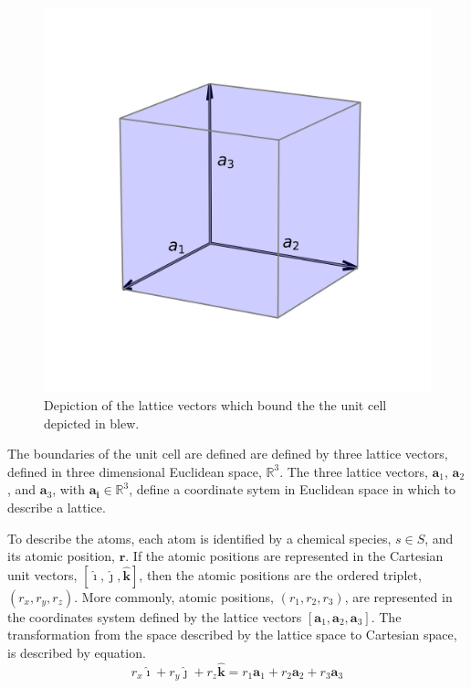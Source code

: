 \begin{figure}[ht]
	\centering
  \includegraphics{chapter3/unit_cell}
  \caption{Depiction of the lattice vectors which bound the the unit cell depicted in blew.}
  \label{fig:unit_cell}
\end{figure}

The boundaries of the unit cell are defined are defined by three lattice vectors, defined in three dimensional Euclidean space, $\mathbb{R}^3$.
The three lattice vectors, $\bm{a}_1$, $\bm{a}_2$, and $\bm{a}_3$, with $\bm{a_i}\in\mathbb{R}^3$, define a coordinate sytem in Euclidean space in which to describe a lattice.

To describe the atoms, each atom is identified by a chemical species, $s\in S$, and its atomic position, $\bm{r}$.
If the atomic positions are represented in the Cartesian unit vectors, $[\hat{\bm{\imath}},\hat{\bm{\jmath}},\hat{\bm{k}}]$, then the atomic positions are the ordered triplet, $(r_x,r_y,r_z)$.
More commonly, atomic positions, $(r_1,r_2,r_3)$, are represented in the coordinates system defined by the lattice vectors $[\bm{a}_1,\bm{a}_2,\bm{a}_3]$.  The transformation from the space described by the lattice space to Cartesian space, is described by equation.
\begin{equation}
	\label{eq:fractional_vs_cartesian_coordinates}
	r_x \hat{\bm{\imath}} + r_y \hat{\bm{\jmath}} + r_z \hat{\bm{k}}
	=
	r_1 \bm{a}_1 + r_2 \bm{a}_2 + r_3 \bm{a}_3
\end{equation}

